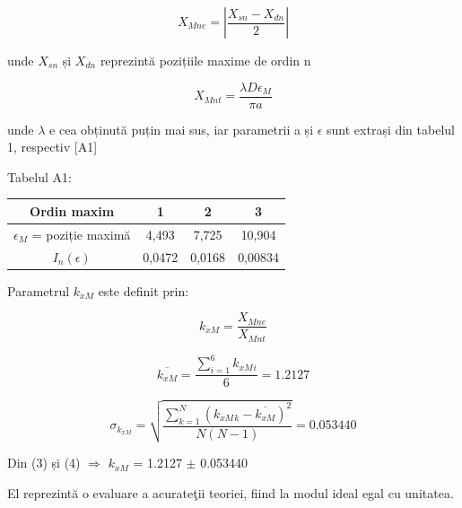\documentclass{article}
\begin{document}
\begin{equation*}
    {X}{_{Mn e}} = |\frac{{X}{_{sn}} - {X}{_{dn}}}{2}|
\end{equation*}

unde ${X}{_{sn}}$ și ${X}{_{dn}}$ reprezintă pozițiile maxime de ordin n

\begin{equation*}
    {X}{_{Mn t}} = \frac{\lambda D {\epsilon}{_M}}{\pi a}
\end{equation*}

\makebox[-0.7cm]{} unde $\lambda$ e cea obținută puțin mai sus, iar parametrii a și $\epsilon$ sunt extrași din tabelul 1, respectiv [A1] \newline

\makebox[-0.7cm]{} Tabelul A1:
\begin{table}[H]
    \begin{tabular}{|c|c|c|c|}
    \hline
    Ordin maxim                       & 1      & 2      & 3       \\ \hline
    ${\epsilon}{_M}$ = poziție maximă & 4,493  & 7,725  & 10,904  \\ \hline
    ${I}{_n}(\epsilon)$               & 0,0472 & 0,0168 & 0,00834 \\ \hline
    \end{tabular}
    \end{table}

Parametrul ${k}{_{xM}}$ este definit prin:

\begin{equation*}
    {k}{_{xM}} = \frac{{X}{_{Mn e}}}{{X}{_{Mn t}}}
\end{equation*}

\begin{equation}
    \overline{{k}{_{xM}}} = \frac{\sum_{i=1}^{6}{{k}{_{xM}}}{_i}}{6} = 1.2127
\end{equation}

\begin{equation}
    {\sigma}{_{{k}{_{xM}}}} = \sqrt{\frac{\sum_{k=1}^{N}({{k}{_{xM}}}{_k} - \overline{{k}{_{xM}}})^2}{N(N-1)}} = 0.053440
\end{equation} \newline

Din (3) și (4) $\Rightarrow$ ${k}{_{xM}}$ = 1.2127 $\pm$ 0.053440 \newline

El reprezintă o evaluare a acurateţii teoriei, fiind la modul ideal egal cu unitatea. \newline \newline
\end{document}
